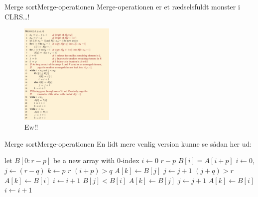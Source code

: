\documentclass[aspectratio=1610]{beamer}
\begin{document}
\begin{frame}{Merge sort}{Merge-operationen}
    Merge-operationen er et rædselsfuldt monster i CLRS\ldots!

    \begin{figure}[h]
        \centering
        \includegraphics[width=0.4\textwidth]{merge-clrs}
        \caption{Ew!!}
        \label{fig:merge-clrs}
    \end{figure}
\end{frame}

\begin{frame}{Merge sort}{Merge-operationen}
    En lidt mere venlig version kunne se sådan her ud:

    \centering
    \begin{minipage}{.8\textwidth}
        \scriptsize
        \begin{tcolorbox}
            
            \vspace{-\abovedisplayskip}
            \begin{codebox}
                \li let $B[0:r-p]$ be a new array with 0-index
                \li \For $i \gets 0$ \To $r-p$ \Do
                    \li $B[i] = A[i+p]$
                \End
                \li $i \gets 0$, $j \gets (r-q)$
                \li \For $k \gets p$ \To $r$ \Do
                    \li \If $(i + p) > q$ \Then
                        \li $A[k] \gets B[j]$
                        \li $j \gets j + 1$
                    \li \ElseIf $(j + q) > r$ \Then
                        \li $A[k] \gets B[i]$
                        \li $i \gets i + 1$
                    \li \ElseIf $B[j] < B[i]$ \Then
                        \li $A[k] \gets B[j]$
                        \li $j \gets j + 1$
                    \li \Else
                        \li $A[k] \gets B[i]$
                        \li $i \gets i + 1$
                    \End
                \End
            \end{codebox}
        \end{tcolorbox}
    \end{minipage}
\end{frame}
\end{document}
